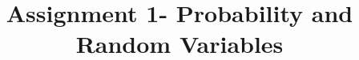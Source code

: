 \documentclass[journal,12pt,twocolumn]{IEEEtran}
\DeclareMathOperator*{\Res}{Res}
\begin{document}
\newcommand{\BEQA}{\begin{eqnarray}}
\newcommand{\EEQA}{\end{eqnarray}}
\newcommand{\define}{\stackrel{\triangle}{=}}

\raggedbottom
\setlength{\parindent}{0pt}
\providecommand{\mbf}{\mathbf}
\providecommand{\pr}[1]{\ensuremath{\Pr\left(#1\right)}}
\providecommand{\qfunc}[1]{\ensuremath{Q\left(#1\right)}}
\providecommand{\sbrak}[1]{\ensuremath{{}\left[#1\right]}}
\providecommand{\lsbrak}[1]{\ensuremath{{}\left[#1\right.}}
\providecommand{\rsbrak}[1]{\ensuremath{{}\left.#1\right]}}
\providecommand{\brak}[1]{\ensuremath{\left(#1\right)}}
\providecommand{\lbrak}[1]{\ensuremath{\left(#1\right.}}
\providecommand{\rbrak}[1]{\ensuremath{\left.#1\right)}}
\providecommand{\cbrak}[1]{\ensuremath{\left\{#1\right\}}}
\providecommand{\lcbrak}[1]{\ensuremath{\left\{#1\right.}}
\providecommand{\rcbrak}[1]{\ensuremath{\left.#1\right\}}}
\theoremstyle{remark}
\newtheorem{rem}{Remark}
\newcommand{\sgn}{\mathop{\mathrm{sgn}}}
\providecommand{\abs}[1]{\vert#1\vert}
\providecommand{\res}[1]{\Res\displaylimits_{#1}} 
\providecommand{\norm}[1]{\lVert#1\rVert}
\providecommand{\mtx}[1]{\mathbf{#1}}
\providecommand{\mean}[1]{E[ #1 ]}
\providecommand{\fourier}{\overset{\mathcal{F}}{ \rightleftharpoons}}
\providecommand{\system}{\overset{\mathcal{H}}{ \longleftrightarrow}}
\newcommand{\solution}{\noindent \textbf{Solution: }}
\newcommand{\cosec}{\,\text{cosec}\,}
\providecommand{\dec}[2]{\ensuremath{\overset{#1}{\underset{#2}{\gtrless}}}}
\newcommand{\myvec}[1]{\ensuremath{\begin{pmatrix}#1\end{pmatrix}}}
\newcommand{\mydet}[1]{\ensuremath{\begin{vmatrix}#1\end{vmatrix}}}
\makeatletter
{}
\makeatother
\let\StandardTheFigure\thefigure
\let\vec\mathbf
\renewcommand{\thefigure}{\theproblem}
\def\putbox#1#2#3{\makebox[0in][l]{\makebox[#1][l]{}\raisebox{\baselineskip}[0in][0in]{\raisebox{#2}[0in][0in]{#3}}}}
     \def\rightbox#1{\makebox[0in][r]{#1}}
     \def\centbox#1{\makebox[0in]{#1}}
     \def\topbox#1{\raisebox{-\baselineskip}[0in][0in]{#1}}
     \def\midbox#1{\raisebox{-0.5\baselineskip}[0in][0in]{#1}}
\vspace{3cm}
\title{Assignment 1- Probability and Random Variables}
\end{document}
